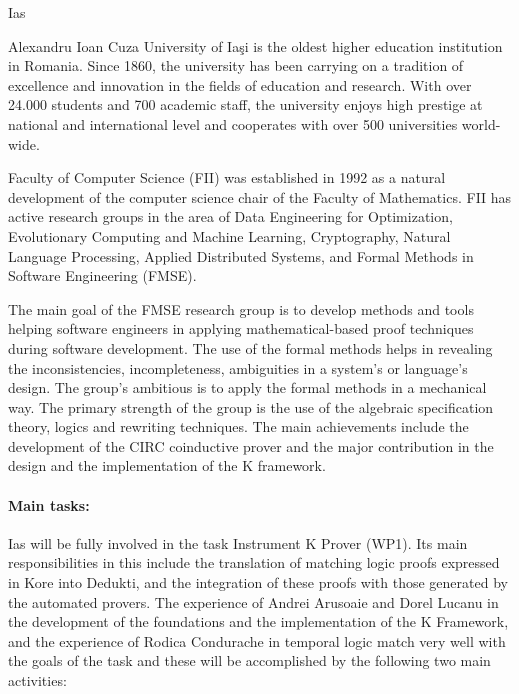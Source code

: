 \begin{sitedescription}{Ias}



Alexandru Ioan Cuza University of Iaşi is the oldest higher education institution in Romania. 
Since 1860, the university has been carrying on a tradition of excellence and innovation in 
the fields of education and research. With over 24.000 students and 700 academic staff, 
the university enjoys high prestige at national and international level and cooperates with  
over 500 universities world-wide. 

Faculty of Computer Science (FII) was established in 1992 as a natural development of the computer 
science chair of the Faculty of Mathematics. FII has active research groups in the area of 
Data Engineering for Optimization, Evolutionary Computing and Machine Learning, Cryptography,
Natural Language Processing, Applied Distributed Systems, and Formal Methods in Software Engineering (FMSE).

The main goal of the FMSE research group is to develop methods and tools helping software
engineers in applying mathematical-based proof techniques during software development.
The use of the formal methods helps in revealing the inconsistencies, incompleteness,
ambiguities in a system's or language's design. The group’s ambitious is to apply the formal
methods in a mechanical way. The primary strength of the group is the use of the algebraic
specification theory, logics and rewriting techniques. The main achievements include the
development of the CIRC coinductive prover and the major contribution in the design and the
implementation of the K framework.

\paragraph*{Main tasks:}

Ias will be fully involved in the task Instrument K Prover (WP1). Its main responsibilities in this 
include the translation of matching logic proofs expressed in Kore into Dedukti, and the integration
of these proofs with those generated by the automated provers. The experience of Andrei Arusoaie and 
Dorel Lucanu in the development of the foundations and the implementation of the K Framework, and
the experience of Rodica Condurache in temporal logic match very well with the goals of the task and
 these will be  accomplished by the following two main activities:


\end{sitedescription}
